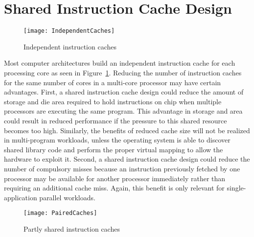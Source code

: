 \section{Shared Instruction Cache Design}


\begin{figure}
\centering
\texttt{[image: IndependentCaches]}
\caption{Independent instruction caches}
\label{fig:indep}
\end{figure}

Most computer architectures build an independent instruction cache for
each processing core as seen in Figure~\ref{fig:indep}.
Reducing the number of instruction caches for the same number of cores
in a multi-core processor may have certain advantages. 
First, a shared instruction cache design could reduce the amount of
storage and die area required to hold instructions on chip when
multiple processors are executing the same program.
This advantage in storage and area could result in reduced performance
if the pressure to this shared resource becomes too high.
Similarly, the benefits of reduced cache size will not be realized in
multi-program workloads, unless the operating system is able to
discover shared library code and perform the proper virtual mapping to
allow the hardware to exploit it.
Second, a shared instruction cache design could reduce the number of
compulsory misses because an instruction previously fetched
by one processor may be available for another processor immediately
rather than requiring an additional cache miss. 
Again, this benefit is only relevant for single-application parallel
workloads. 

\begin{figure}
\centering
\texttt{[image: PairedCaches]}
\caption{Partly shared instruction caches}
\label{fig:paired}
\end{figure}

